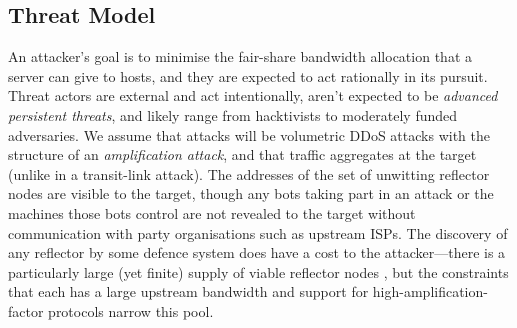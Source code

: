 %

\subsection{Threat Model}
An attacker's goal is to minimise the fair-share bandwidth allocation that a server can give to hosts, and they are expected to act rationally in its pursuit.
Threat actors are external and act intentionally, aren't expected to be 
\emph{advanced persistent threats}, and likely range from hacktivists to moderately funded adversaries.
We assume that attacks will be volumetric DDoS attacks with the structure of an \emph{amplification attack}, and that traffic aggregates at the target (unlike in a transit-link attack).
The addresses of the set of unwitting reflector nodes are visible to the target, though any bots taking part in an attack or the machines those bots control are not revealed to the target without communication with  party organisations such as upstream ISPs.
The discovery of any reflector by some defence system does have a cost to the attacker---there is a particularly large (yet finite) supply of viable reflector nodes \cite{DBLP:conf/ndss/Rossow14}, but the constraints that each has a large upstream bandwidth and support for high-amplification-factor protocols narrow this pool.

